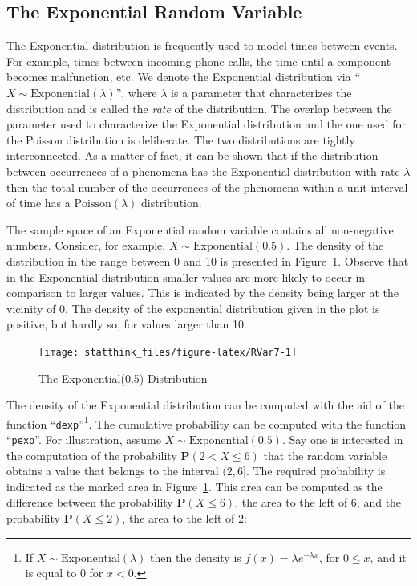 \documentclass[
]{krantz}
\newcommand{\Prob}{\mathbf{P}}
\theoremstyle{definition}
\theoremstyle{definition}
\theoremstyle{definition}
\theoremstyle{remark}
\begin{document}
\hypertarget{the-exponential-random-variable}{%
\subsection{The Exponential Random Variable}\label{the-exponential-random-variable}}

The Exponential distribution is frequently used to model times between
events. For example, times between incoming phone calls, the time until
a component becomes malfunction, etc. We denote the Exponential
distribution via ``\(X \sim \mathrm{Exponential}(\lambda)\)'', where
\(\lambda\) is a parameter that characterizes the distribution and is
called the \emph{rate} of the distribution. The overlap between the parameter
used to characterize the Exponential distribution and the one used for
the Poisson distribution is deliberate. The two distributions are
tightly interconnected. As a matter of fact, it can be shown that if the
distribution between occurrences of a phenomena has the Exponential
distribution with rate \(\lambda\) then the total number of the
occurrences of the phenomena within a unit interval of time has a
\(\mathrm{Poisson}(\lambda)\) distribution.

The sample space of an Exponential random variable contains all
non-negative numbers. Consider, for example,
\(X \sim \mathrm{Exponential}(0.5)\). The density of the distribution in
the range between 0 and 10 is presented in Figure~\ref{fig:RVar7}.
Observe that in the Exponential distribution smaller values are more
likely to occur in comparison to larger values. This is indicated by the
density being larger at the vicinity of 0. The density of the
exponential distribution given in the plot is positive, but hardly so,
for values larger than 10.

\begin{figure}

{\centering \texttt{[image: statthink\_files/figure-latex/RVar7-1]} 

}

\caption{The Exponential(0.5) Distribution}\label{fig:RVar7}
\end{figure}

The density of the Exponential distribution can be computed with the aid
of the function ``\texttt{dexp}''\footnote{If \(X \sim \mathrm{Exponential}(\lambda)\) then the density
  is \(f(x) =\lambda e^{-\lambda x}\), for \(0 \leq x\), and it is equal
  to 0 for \(x < 0\).}. The cumulative probability can be computed
with the function ``\texttt{pexp}''. For illustration, assume
\(X \sim \mathrm{Exponential}(0.5)\). Say one is interested in the
computation of the probability \(\Prob(2 < X \leq 6)\) that the random
variable obtains a value that belongs to the interval \((2,6]\). The
required probability is indicated as the marked area in
Figure~\ref{fig:RVar7}. This area can be computed as the difference
between the probability \(\Prob(X \leq 6)\), the area to the left of 6,
and the probability \(\Prob(X \leq 2)\), the area to the left of 2:
\end{document}
